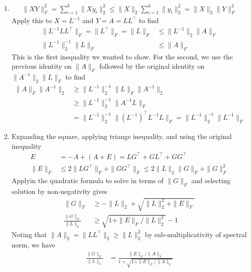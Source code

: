 \documentclass[12pt,letterpaper,boxed]{hmcpset}
\begin{document}
\begin{problem}
	
\end{problem}

\begin{solution}
  \begin{enumerate}
    \item
      \begin{align}
	\|X Y\|_F^2
	= \sum_{i=1}^k \| X y_i \|_2^2
	\leq \|X\|_2 \sum_{i=1}^k \|y_i\|_2^2
	= \|X\|_2 \|Y\|_F^2
      \end{align}
      Apply this to $X = L^{-1}$ and $Y = A = L L^\top$ to find
      \begin{align}
	\| L^{-1} L L^\top \|_F
	= \| L^\top \|_F
	= \| L \|_F
	&\leq \| L^{-1}\|_2 \|A\|_F \\
	\|L^{-1}\|_2^{-1} \|L\|_F
	&\leq \|A\|_F
      \end{align}
      This is the first inequality we wanted to show. 
      For the second, we use the previous identity on $\|A\|_F$
      followed by the original identity on $\|A^{-1}\|_2 \|L\|_F$
      to find
      \begin{align}
	\|A\|_F \|A^{-1}\|_2
	&\geq \|L^{-1}\|_2^{-1} \|L\|_F \|A^{-1}\|_2  \\
	&\geq \|L^{-1}\|_2^{-1} \|A^{-1} L\|_F \\
	&= \|L^{-1}\|_2^{-1} \|(L^{-1})^\top L^{-1} L\|_F
	= \|L^{-1}\|_2^{-1} \|L^{-1}\|_F
      \end{align}

    \item
      Expanding the square, applying triange inequality, and using the original
      inequality
      \begin{align}
	E 
	&= -A + (A + E)
	= L G^\top + G L^\top + G G^\top \\
	\|E\|_F &\leq 2 \|L G^\top\|_F + \|G G^\top\|_F
		\leq 2 \|L\|_2 \|G\|_F + \|G\|_F^2
      \end{align}
      Applyin the quadratic formula to solve in terms of $\|G\|_F$
      and selecting solution by non-negativity gives
      \begin{align}
	\|G\|_F &\geq -\|L\|_2 + \sqrt{\|L\|_2^2 + \|E\|_F} \\
	\frac{\|G\|_F}{\|L\|_2} &\geq \sqrt{1 + \|E\|_F / \|L\|^2_2}  - 1
      \end{align}
      Noting that $\|A\|_2 = \|L L^\top\|_2 \geq \|L\|_2^2$ by
      sub-multiplicativity of spectral norm, we have
      \begin{align}
	\frac{\|G\|_F}{\|L\|_2} 
	&= \frac{\|E\|_F / \|A\|_2}{1 + \sqrt{1 + \|E\|_F / \|A\|_2}}
      \end{align}


\end{enumerate}
\end{solution}
\end{document}
